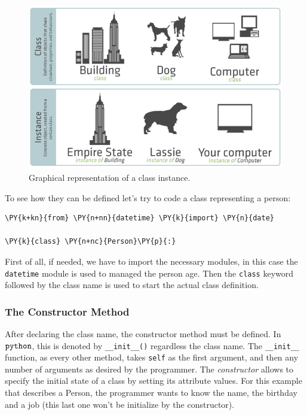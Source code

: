 \begin{figure}[htb]
  \centering
  \includegraphics[width=0.8\linewidth]{figures/classes_instances.png}
  \caption{Graphical representation of a class instance.}
  \label{fig:classes}
\end{figure}

To see how they can be defined let's try to code a class representing a person:
\begin{tcolorbox}[breakable, size=fbox, boxrule=1pt, pad at break*=1mm,colback=cellbackground, colframe=cellborder]
\begin{Verbatim}[commandchars=\\\{\}]
\PY{k+kn}{from} \PY{n+nn}{datetime} \PY{k}{import} \PY{n}{date}        

\PY{k}{class} \PY{n+nc}{Person}\PY{p}{:}
\end{Verbatim}
\end{tcolorbox}

First of all, if needed, we have to import the necessary modules, in this case the \texttt{datetime} module is used to managed the person age.
Then the \texttt{class} keyword followed by the class name is used to start the actual class definition.

\subsubsection{The Constructor Method}\label{the-constructor-method}

After declaring the class name, the constructor method must be defined.
In \(\tt{python}\), this is denoted by \texttt{\_\_init\_\_()}
regardless the class name. The \texttt{\_\_init\_\_} function, as every
other method, takes \texttt{self} as the first argument, and then any
number of arguments as desired by the programmer. The \emph{constructor}
allows to specify the initial state of a class by setting its attribute
values. For this example that describes a Person, the programmer wants
to know the name, the birthday and a job (this last one won't be initialize by the constructor).

